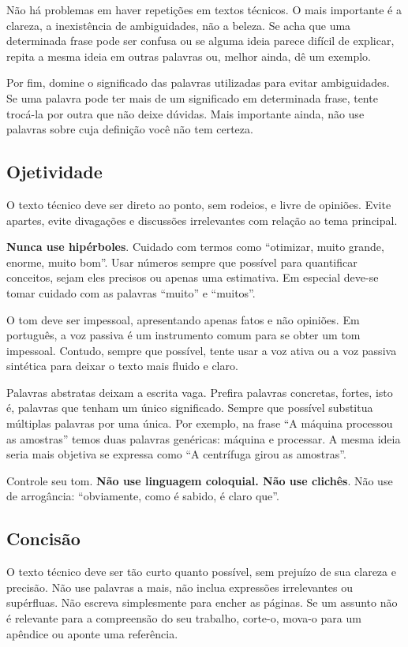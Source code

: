 Não há problemas em haver repetições em textos técnicos. O mais importante é a clareza, a inexistência de ambiguidades, não a beleza. Se acha que uma determinada frase pode ser confusa ou se alguma ideia parece difícil de explicar, repita a mesma ideia em outras palavras ou, melhor ainda, dê um exemplo.

Por fim, domine o significado das palavras utilizadas para evitar ambiguidades. Se uma palavra pode ter mais de um significado em determinada frase, tente trocá-la por outra que não deixe dúvidas. Mais importante ainda, não use palavras sobre cuja definição você não tem certeza.

\subsection{Ojetividade}

O texto técnico deve ser direto ao ponto, sem rodeios, e livre de opiniões. Evite apartes, evite divagações e discussões irrelevantes com relação ao tema principal.

\textbf{Nunca use hipérboles}. Cuidado com termos como ``otimizar, muito grande, enorme, muito bom''.  Usar números sempre que possível para quantificar conceitos, sejam eles precisos ou apenas uma estimativa. Em especial deve-se tomar cuidado com as palavras ``muito'' e ``muitos''.

O tom deve ser impessoal, apresentando apenas fatos e não opiniões. Em português, a voz passiva é um instrumento comum para se obter um tom impessoal. Contudo, sempre que possível, tente usar a voz ativa ou a voz passiva sintética para deixar o texto mais fluido e claro.

Palavras abstratas deixam a escrita vaga. Prefira palavras concretas, fortes, isto é, palavras que tenham um único significado. Sempre que possível substitua múltiplas palavras por uma única. Por exemplo, na frase ``A máquina processou as amostras'' temos duas palavras genéricas: máquina e processar. A mesma ideia seria mais objetiva se expressa como ``A centrífuga girou as amostras''.

Controle seu tom. \textbf{Não use linguagem coloquial. Não use clichês}. Não use de arrogância: ``obviamente, como é sabido, é claro que''. 

\subsection{Concisão}

O texto técnico deve ser tão curto quanto possível, sem prejuízo de sua clareza e precisão. Não use palavras a mais, não inclua expressões irrelevantes ou supérfluas. Não escreva simplesmente para encher as páginas. Se um assunto não é relevante para a compreensão do seu trabalho, corte-o, mova-o para um apêndice ou aponte uma referência.

